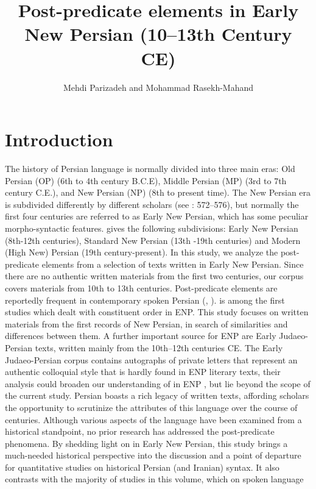 \documentclass[output=paper,colorlinks,citecolor=brown,draftmode]{langscibook}
\author{Mehdi Parizadeh\affiliation{Bu-Ali Sina University, Hamedan} and Mohammad Rasekh-Mahand\affiliation{Bu-Ali Sina University, Hamedan}}
\title{Post-predicate elements in Early New Persian (10--13th Century CE)}
\begin{document}
\maketitle\label{WOWA:ch:8}

\section{Introduction}\label{ENP:ss:1}

The history of Persian language is normally divided into three main eras: Old Persian (OP) (6th to 4th century B.C.E), Middle Persian (MP) (3rd to 7th century C.E.), and New Persian (NP) (8th to present time). The New Persian era is subdivided differently by different scholars (see \citealt{paul_persian_2018}: 572--576), but normally the first four centuries are referred to as Early New Persian, which has some peculiar morpho-syntactic features. \citet[576]{paul_persian_2018} gives the following subdivisions: Early New Persian (8th-12th centuries), Standard New Persian (13th -19th centuries) and Modern (High New) Persian (19th century-present). In this study, we analyze the post-predicate elements from a selection of texts written in Early New Persian. Since there are no authentic written materials from the first two centuries, our corpus covers materials from 10th to 13th centuries. Post-predicate elements are reportedly frequent in contemporary spoken Persian (\citealt{frommer_post-verbal_1981}, ). \citet{lazard_langue_1963} is among the first studies which dealt with constituent order in ENP. This study focuses on written materials from the first records of New Persian, in search of similarities and differences between them. A further important source for ENP are Early Judaeo-Persian texts, written mainly from the 10th--12th centuries CE. The Early Judaeo-Persian corpus contains autographs of private letters that represent an authentic colloquial style that is hardly found in ENP literary texts, their analysis could broaden our understanding of  in ENP \citep{paul_grammar_2013}, but lie beyond the scope of the current study. Persian boasts a rich legacy of written texts, affording scholars the opportunity to scrutinize the attributes of this language over the course of centuries. Although various aspects of the language have been examined from a historical standpoint, no prior research has addressed the post-predicate phenomena. By shedding light on  in Early New Persian, this study brings a much-needed historical perspective into the discussion and a point of departure for quantitative studies on historical Persian (and Iranian) syntax. It also contrasts with the majority of studies in this volume, which  on spoken language
\end{document}
